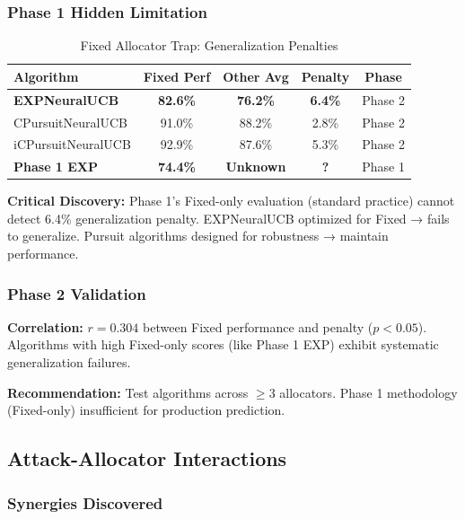 \documentclass[11pt,a4paper]{article}
\newcommand{\performance}[1]{\textcolor{performancecolor}{\textbf{#1}}}
\newcommand{\critical}[1]{\textcolor{criticalcolor}{\textbf{#1}}}
\begin{document}
\subsubsection{Phase 1 Hidden Limitation}

\begin{table}[h]
\centering\small
\caption{Fixed Allocator Trap: Generalization Penalties}
\begin{tabular}{lcccc}
\toprule
\textbf{Algorithm} & \textbf{Fixed Perf} & \textbf{Other Avg} & \textbf{Penalty} & \textbf{Phase} \\
\midrule
\critical{EXPNeuralUCB} & \critical{82.6\%} & \critical{76.2\%} & \critical{6.4\%} & Phase 2 \\
CPursuitNeuralUCB & 91.0\% & 88.2\% & 2.8\% & Phase 2 \\
iCPursuitNeuralUCB & 92.9\% & 87.6\% & 5.3\% & Phase 2 \\
\midrule
\textbf{Phase 1 EXP} & \performance{\textbf{74.4\%}} & \textbf{Unknown} & \textbf{?} & Phase 1 \\
\bottomrule
\end{tabular}
\end{table}

\textbf{Critical Discovery:} Phase 1's Fixed-only evaluation (standard practice) cannot detect 6.4\% generalization penalty. EXPNeuralUCB optimized for Fixed → fails to generalize. Pursuit algorithms designed for robustness → maintain performance.

\subsubsection{Phase 2 Validation}

\textbf{Correlation:} $r = 0.304$ between Fixed performance and penalty ($p < 0.05$). Algorithms with high Fixed-only scores (like Phase 1 EXP) exhibit systematic generalization failures.

\textbf{Recommendation:} Test algorithms across $\geq$3 allocators. Phase 1 methodology (Fixed-only) insufficient for production prediction.

\subsection{Attack-Allocator Interactions}

\subsubsection{Synergies Discovered}
\end{document}
